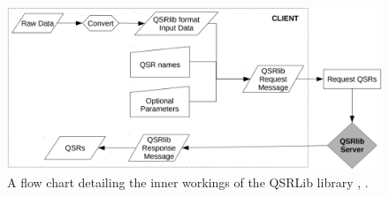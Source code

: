 \begin{figure}[h]
	\centering
	\includegraphics[scale=0.7]{images/qsrlib_flow}
	\caption{A flow chart detailing the inner workings of the QSRLib library \cite{qsrlib}, \cite{gatsoulis2016qsrlib}.}
	\label{fig:qsrlibflow}
\end{figure}


